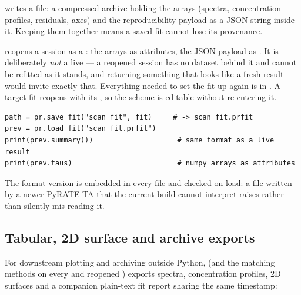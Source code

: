  writes a  file: a compressed
 archive holding the arrays (spectra, concentration profiles,
residuals, axes) and the reproducibility payload as a JSON string inside it.
Keeping them together means a saved fit cannot lose its provenance.

 reopens a session as a : the arrays
as attributes, the JSON payload as . It is deliberately \emph{not}
a live  --- a reopened session has no dataset behind it and
cannot be refitted as it stands, and returning something that looks like a
fresh result would invite exactly that. Everything needed to set the fit up
again is in . A target fit reopens with its ,
so the scheme is editable without re-entering it.

\begin{lstlisting}
path = pr.save_fit("scan_fit", fit)     # -> scan_fit.prfit
prev = pr.load_fit("scan_fit.prfit")
print(prev.summary())                    # same format as a live result
print(prev.taus)                         # numpy arrays as attributes
\end{lstlisting}

The format version is embedded in every file and checked on load: a file
written by a newer PyRATE-TA that the current build cannot interpret raises rather
than silently mis-reading it.

\subsection{Tabular, 2D surface and archive exports}\label{sec:exports}

For downstream plotting and archiving outside Python, 
(and the matching methods on every  and reopened
) exports spectra, concentration profiles, 2D surfaces and a
companion plain-text fit report sharing the same 
timestamp:

